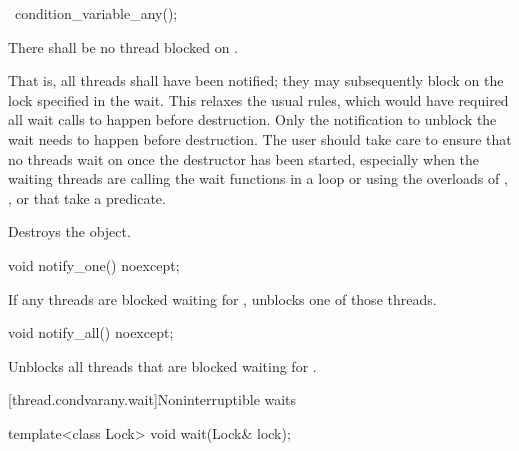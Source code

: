%
\begin{itemdecl}
~condition_variable_any();
\end{itemdecl}

\begin{itemdescr}
\pnum
\requires There shall be no thread blocked on .
\begin{note}
That is, all
threads shall have been notified; they may subsequently block on the lock specified in the
wait.
This relaxes the usual rules, which would have required all wait calls to happen before
destruction. Only the notification to unblock the wait needs to happen before destruction.
The user should take care to ensure that no threads wait on  once the destructor has
been started, especially when the waiting threads are calling the wait functions in a loop or
using the overloads of , , or  that take a predicate.
\end{note}

\pnum
\effects
Destroys the object.
\end{itemdescr}

%
\begin{itemdecl}
void notify_one() noexcept;
\end{itemdecl}

\begin{itemdescr}
\pnum
\effects
If any threads are blocked waiting for , unblocks one of those threads.
\end{itemdescr}

%
\begin{itemdecl}
void notify_all() noexcept;
\end{itemdecl}

\begin{itemdescr}
\pnum
\effects
Unblocks all threads that are blocked waiting for .
\end{itemdescr}

[thread.condvarany.wait]{Noninterruptible waits}

%
\begin{itemdecl}
template<class Lock>
  void wait(Lock& lock);
\end{itemdecl}

